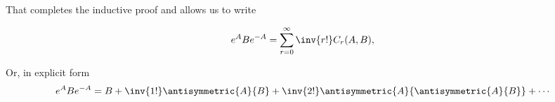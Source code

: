 That completes the inductive proof and allows us to write 

\begin{align}\label{eqn:exponentialSandwichCommutator:3}
e^A B e^{-A}
&=
\sum_{r=0}^\infty \inv{r!} C_{r}(A,B),
\end{align}

Or, in explicit form
\begin{align}\label{eqn:exponentialSandwichCommutator:4}
e^A B e^{-A}
&=
B 
+ \inv{1!} \antisymmetric{A}{B}
+ \inv{2!} 
\antisymmetric{A}{\antisymmetric{A}{B}}
+ \cdots
\end{align}

\EndArticle
